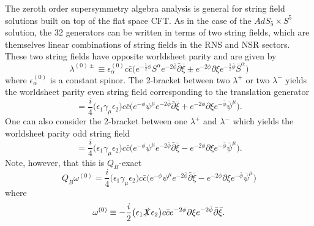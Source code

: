 \documentclass[12pt]{article}
\def\be{\begin{equation}}
\def\ee{\end{equation}}
\def\ie{\begin{equation}\begin{aligned}}
\def\fe{\end{aligned}\end{equation}}
\numberwithin{equation}{section}
\newcommand{\B}[1]{\bar{#1}}
\begin{document}
The zeroth order supersymmetry algebra analysis is general for string field solutions built on top of the flat space CFT. As in the case of the $AdS_5\times S^5$ solution, the 32 generators can be written in terms of two string fields, which are themselves linear combinations of string fields in the RNS and NSR sectors. These two string fields have opposite worldsheet parity and are given by
\be
    \lambda^{(0)\pm}\equiv\epsilon^{(0)}_{\alpha}c\B{c}\big(e^{-\frac{1}{2}\phi}S^{\alpha}e^{-2\B{\phi}}\B{\partial}\B{\xi}\pm e^{-2\phi}\partial\xi e^{-\frac{1}{2}\B{\phi}}\B{S}^{\alpha}\big)
\ee
where $\epsilon^{(0)}_{\alpha}$ is a constant spinor. The 2-bracket between two $\lambda^+$ or two $\lambda^-$ yields the worldsheet parity even string field corresponding to the translation generator
\be
    [\lambda_1^{\pm}\otimes\lambda_2^{\pm}]=\frac{i}{4}\big(\epsilon_1\gamma_{\mu}\epsilon_2\big)c\B{c}\big(e^{-\phi}\psi^{\mu}e^{-2\B{\phi}}\B{\partial}\B{\xi}+e^{-2\phi}\partial\xi e^{-\B{\phi}}\B{\psi}^{\mu}\big).
\ee
One can also consider the 2-bracket between one $\lambda^+$ and $\lambda^-$ which yields the worldsheet parity odd string field
\be
    [\lambda_1^{+}\otimes\lambda_2^{-}]=\frac{i}{4}\big(\epsilon_1\gamma_{\mu}\epsilon_2\big)c\B{c}\big(e^{-\phi}\psi^{\mu}e^{-2\B{\phi}}\B{\partial}\B{\xi}-e^{-2\phi}\partial\xi e^{-\B{\phi}}\B{\psi}^{\mu}\big).
\ee
Note, however, that this is $Q_{B}$-exact
\be
    Q_{B}\omega^{(0)}=\frac{i}{4}\big(\epsilon_1\gamma_{\mu}\epsilon_2\big)c\B{c}\big(e^{-\phi}\psi^{\mu}e^{-2\B{\phi}}\B{\partial}\B{\xi}-e^{-2\phi}\partial\xi e^{-\B{\phi}}\B{\psi}^{\mu}\big)
\ee
where
\ie
    \omega^{(0)}\equiv-\frac{i}{2}\big(\epsilon_1\slashed{X}\epsilon_2\big)c\B{c}e^{-2\phi}\partial\xi e^{-2\B{\phi}}\B{\partial}\B{\xi}.
\fe
\end{document}
